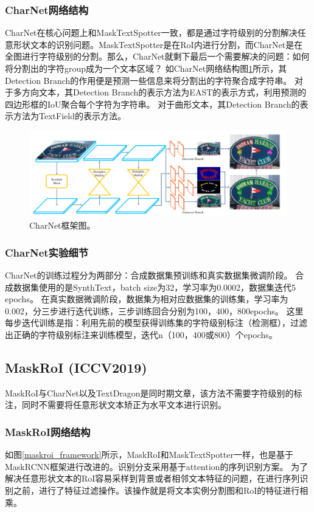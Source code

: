 \subsubsection{CharNet网络结构}
CharNet在核心问题上和MaskTextSpotter一致，都是通过字符级别的分割解决任意形状文本的识别问题。MaskTextSpotter是在RoI内进行分割，而CharNet是在
全图进行字符级别的分割。那么，CharNet就剩下最后一个需要解决的问题：如何将分割出的字符group成为一个文本区域？
如CharNet网络结构图\ref{charnet_framework}所示，其Detection Branch的作用便是预测一些信息来将分割出的字符聚合成字符串。
对于多方向文本，其Detection Branch的表示方法为EAST\cite{zhou2017east}的表示方式，利用预测的四边形框的IoU聚合每个字符为字符串。
对于曲形文本，其Detection Branch的表示方法为TextField\cite{xu2019textfield}的表示方法。
\begin{figure}[htb]
    \centering
    \includegraphics[width=.98\textwidth]{figure/spotting/charnet_framework.png} 
    \caption{CharNet框架图。} 
    \label{charnet_framework} 
\end{figure}

\subsubsection{CharNet实验细节}
CharNet的训练过程分为两部分：合成数据集预训练和真实数据集微调阶段。
合成数据集使用的是SynthText，batch size为32，学习率为0.0002，数据集迭代5 epochs。
在真实数据微调阶段，数据集为相对应数据集的训练集，学习率为0.002，分三步进行迭代训练，三步训练回合分别为100，400，800epochs。
这里每步迭代训练是指：利用先前的模型获得训练集的字符级别标注（检测框），过滤出正确的字符级别标注来训练模型，迭代n（100，400或800）个epochs。

\subsection{MaskRoI (ICCV2019)}
MaskRoI与CharNet以及TextDragon是同时期文章，该方法不需要字符级别的标注，同时不需要将任意形状文本矫正为水平文本进行识别。
\subsubsection{MaskRoI网络结构}
如图\ref{maskroi_framework}所示，MaskRoI和MaskTextSpotter一样，也是基于MaskRCNN框架进行改进的。识别分支采用基于attention的序列识别方案。
为了解决任意形状文本的RoI容易采样到背景或者相邻文本特征的问题，在进行序列识别之前，进行了特征过滤操作。该操作就是将文本实例分割图和RoI的特征进行相乘。

